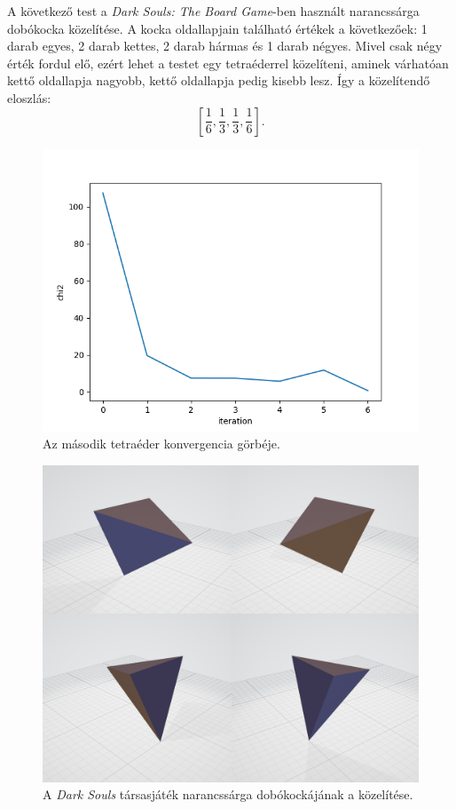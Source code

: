 A következő test a \textit{Dark Souls: The Board Game}-ben \cite{darksouls} használt narancssárga dobókocka közelítése.
A kocka oldallapjain található értékek a következőek: 1 darab egyes, 2 darab kettes, 2 darab hármas és 1 darab négyes.
Mivel csak négy érték fordul elő, ezért lehet a testet egy tetraéderrel közelíteni, aminek várhatóan kettő oldallapja nagyobb, kettő oldallapja pedig kisebb lesz.
Így a közelítendő eloszlás:
$$
\left[\frac{1}{6}, \frac{1}{3}, \frac{1}{3}, \frac{1}{6}\right].
$$

\begin{figure}[h!]
	\centering
	\includegraphics[scale=0.7]{images/tetrahedron_02.png}
	\caption{Az második tetraéder konvergencia görbéje.}
	\label{fig:tetra02}
\end{figure}

\begin{figure}[h!]
	\centering
	\includegraphics[width=\textwidth]{images/tetra02obj.png}
	\caption{A \textit{Dark Souls} társasjáték narancssárga dobókockájának a közelítése.}
	\label{fig:tetra02obj}
\end{figure}

